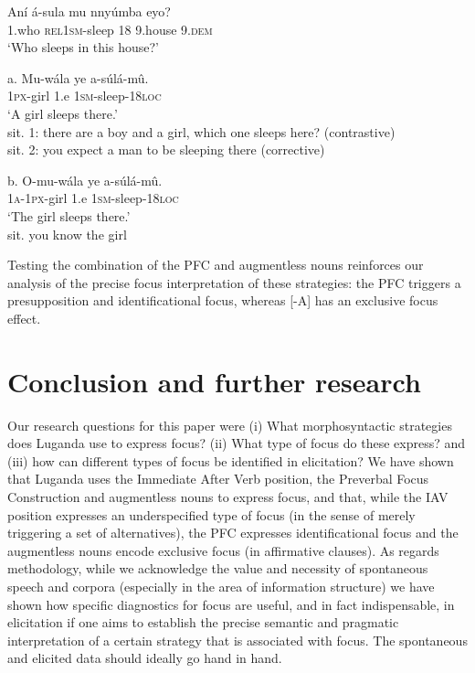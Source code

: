 \documentclass[output=paper]{langsci/langscibook}
\begin{document}
\ea
\gll   Aní  á-sula      mu  nnyúmba  eyo?\\
       1.who  \textsc{rel1sm}-sleep  18  9.house  9.\textsc{dem}\\
\glt   ‘Who sleeps in this house?’
\z

\ea
\gll   a.  Mu-wála  ye  a-súlá-mû.\\
         \textsc{1px}-girl  1.e  \textsc{1sm}-sleep-\textsc{18loc}\\
\glt ‘A girl sleeps there.’\\
sit. 1: there are a boy and a girl, which one sleeps here? (contrastive)\\
sit. 2: you expect a man to be sleeping there (corrective)
\z

\ea
\gll   b.  O-mu-wála  ye  a-súlá-mû.\\
         \textsc{1a}-\textsc{1px}-girl  1.e  \textsc{1sm}-sleep-\textsc{18loc}\\
\glt ‘The girl sleeps there.’\\
sit. you know the girl
\z

Testing the combination of the PFC and augmentless nouns reinforces our analysis of the precise focus interpretation of these strategies: the PFC triggers a presupposition and identificational focus, whereas [-A] has an exclusive focus effect.

\section{Conclusion and further research} 

Our research questions for this paper were 
(i) What morphosyntactic strategies does Luganda use to express focus? 
(ii) What type of focus do these express? 
and (iii) how can different types of focus be identified in elicitation? We have shown that Luganda uses the Immediate After Verb position, the Preverbal Focus Construction and augmentless nouns to express focus, and that, while the IAV position expresses an underspecified type of focus (in the sense of merely triggering a set of alternatives), the PFC expresses identificational focus and the augmentless nouns encode exclusive focus (in affirmative clauses). As regards methodology, while we acknowledge the value and necessity of spontaneous speech and corpora (especially in the area of information structure) we have shown how specific diagnostics for focus are useful, and in fact indispensable, in elicitation if one aims to establish the precise semantic and pragmatic interpretation of a certain strategy that is associated with focus. The spontaneous and elicited data should ideally go hand in hand.
\end{document}

